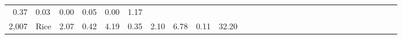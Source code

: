 \documentclass[]{article}
\begin{document}
\begin{longtable}[]{@{}rlrrrrrrrrrrrrrrrrrrrrrrrrrrr@{}}
\begin{minipage}[t]{0.01\columnwidth}
0.37\strut
\end{minipage} & \begin{minipage}[t]{0.02\columnwidth}\raggedleft\strut
0.03\strut
\end{minipage} & \begin{minipage}[t]{0.01\columnwidth}\raggedleft\strut
0.00\strut
\end{minipage} & \begin{minipage}[t]{0.01\columnwidth}\raggedleft\strut
0.05\strut
\end{minipage} & \begin{minipage}[t]{0.01\columnwidth}\raggedleft\strut
0.00\strut
\end{minipage} & \begin{minipage}[t]{0.01\columnwidth}\raggedleft\strut
1.17\strut
\end{minipage}\tabularnewline
\begin{minipage}[t]{0.01\columnwidth}\raggedleft\strut
2,007\strut
\end{minipage} & \begin{minipage}[t]{0.02\columnwidth}\raggedright\strut
Rice\strut
\end{minipage} & \begin{minipage}[t]{0.01\columnwidth}\raggedleft\strut
2.07\strut
\end{minipage} & \begin{minipage}[t]{0.02\columnwidth}\raggedleft\strut
0.42\strut
\end{minipage} & \begin{minipage}[t]{0.02\columnwidth}\raggedleft\strut
4.19\strut
\end{minipage} & \begin{minipage}[t]{0.02\columnwidth}\raggedleft\strut
0.35\strut
\end{minipage} & \begin{minipage}[t]{0.01\columnwidth}\raggedleft\strut
2.10\strut
\end{minipage} & \begin{minipage}[t]{0.01\columnwidth}\raggedleft\strut
6.78\strut
\end{minipage} & \begin{minipage}[t]{0.01\columnwidth}\raggedleft\strut
0.11\strut
\end{minipage} & \begin{minipage}[t]{0.01\columnwidth}\raggedleft\strut
32.20\strut
\end{minipage} & \begin{minipage}[t]{0.01\columnwidth}\raggedleft\strut

\end{minipage}
\end{longtable}
\end{document}
